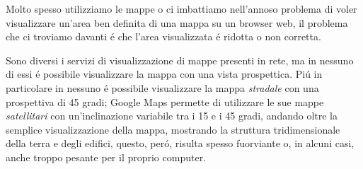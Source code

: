 Molto spesso utilizziamo le mappe o ci imbattiamo nell'annoso problema di voler visualizzare un'area ben definita di una mappa su un browser web, il problema che ci troviamo davanti \'e che l'area visualizzata \'e ridotta o non corretta. 


Sono diversi i servizi di visualizzazione di mappe presenti in rete, ma in nessuno di essi \'e possibile visualizzare la mappa con una vista prospettica. Pi\'u in particolare in nessuno \'e possibile visualizzare la mappa \textit{stradale} con una prospettiva di 45 gradi; Google Maps permette di utilizzare le sue mappe \textit{satellitari} con un'inclinazione variabile tra i 15 e i 45 gradi, andando oltre la semplice visualizzazione della mappa, mostrando la struttura tridimensionale della terra e degli edifici, questo, per\'o, risulta spesso fuorviante o, in alcuni casi, anche troppo pesante per il proprio computer.
